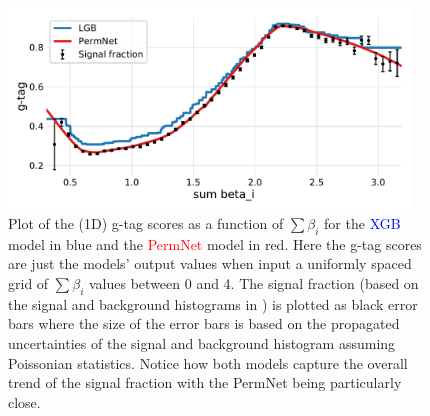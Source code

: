 \begin{figure}
  \includegraphics[width=0.95\textwidth, trim=10 10 10 20, clip]{figures/quarks/gtag_sum_models_njet=4-down_sample=1.00-ML_vars=vertex-selection=b-ejet_min=4-n_iter_RS_lgb=99-n_iter_RS_xgb=9-cdot_cut=0.90-version=19.pdf}
  \caption[1D Sum Models Predictions and Signal Fraction for 4-jets]
          {Plot of the (1D) g-tag scores as a function of $\sum \beta_i$ for the \textcolor{blue}{XGB} model in blue and the \textcolor{red}{PermNet} model in red. Here the g-tag scores are just the models' output values when input a uniformly spaced grid of $\sum \beta_i$ values between 0 and 4. The signal fraction (based on the signal and background histograms in ) is plotted as black error bars where the size of the error bars is based on the propagated uncertainties of the signal and background histogram assuming Poissonian statistics. Notice how both models capture the overall trend of the signal fraction with the PermNet being particularly close. 
          } 
  \label{fig:q:1d_sum_models_signal_fraction_4j}
\end{figure}




